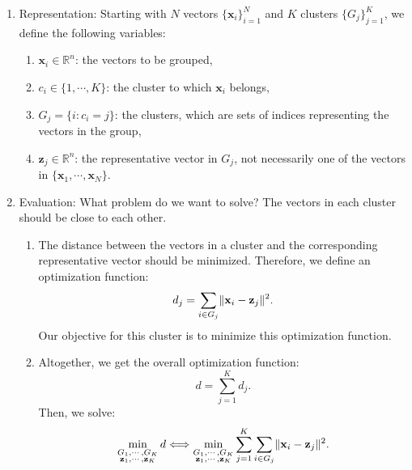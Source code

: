 \documentclass{huhtakm-template-book-v2}
\begin{document}
    \begin{enumerate}
        \item Representation: Starting with $N$ vectors $\{\mathbf{x}_{i}\}_{i=1}^{N}$ and $K$ clusters $\{G_{j}\}_{j=1}^{K}$, we define the following variables:
        \begin{enumerate}
            \item $\mathbf{x}_{i}\in\mathbb{R}^{n}$: the vectors to be grouped,
            \item $c_{i}\in\{1,\cdots,K\}$: the cluster to which $\mathbf{x}_{i}$ belongs,
            \item $G_{j} = \{i : c_{i} = j\}$: the clusters, which are sets of indices representing the vectors in the group,
            \item $\mathbf{z}_{j}\in\mathbb{R}^{n}$: the representative vector in $G_{j}$, not necessarily one of the vectors in $\{\mathbf{x}_{1}, \cdots, \mathbf{x}_{N}\}$.
        \end{enumerate}
        \item Evaluation: What problem do we want to solve? The vectors in each cluster should be close to each other.
        \begin{enumerate}
            \item The distance between the vectors in a cluster and the corresponding representative vector should be minimized. Therefore, we define an optimization function:
            \begin{equation*}
                d_{j} = \sum_{i \in G_{j}}\lVert{\mathbf{x}_{i} - \mathbf{z}_{j}}\rVert^{2}.
            \end{equation*}
            Our objective for this cluster is to minimize this optimization function.
            \item Altogether, we get the overall optimization function:
            \begin{equation*}
                d = \sum_{j=1}^{K}d_{j}.
            \end{equation*}
            Then, we solve:
            \begin{equation*}
                \min_{\substack{G_{1}, \cdots, G_{K}\\\mathbf{z}_{1}, \cdots, \mathbf{z}_{K}}}d \Longleftrightarrow \min_{\substack{G_{1}, \cdots, G_{K}\\\mathbf{z}_{1}, \cdots, \mathbf{z}_{K}}}\sum_{j=1}^{K}\sum_{i \in G_{j}}\lVert{\mathbf{x}_{i} - \mathbf{z}_{j}}\rVert^{2}.
            \end{equation*}
        \end{enumerate}

\end{enumerate}
\end{document}
